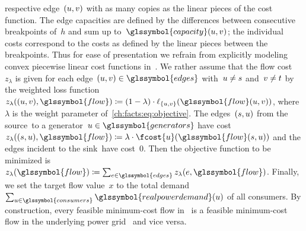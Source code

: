 respective edge~$(u, v)$ with as many copies as the linear pieces
of the cost function. The edge capacities are defined by the differences between
consecutive breakpoints of~$h$ and sum up to~$\glssymbol{capacity}(\vertexa,
\vertexb)$; the individual costs correspond to the costs as defined by the
linear pieces between the breakpoints. Thus for ease of presentation we refrain
from explicitly modeling convex piecewise linear cost functions
in~. We rather assume that the flow cost~$z_\lambda$ is given
for each edge~$ (\vertexa,\vertexb)\in\glssymbol{edges}$ with~$u \ne
s$ and~$v \ne
t$ by the weighted loss function~$
z_\lambda((\vertexa,\vertexb),\glssymbol{flow})
\coloneqq 
(1-\lambda) 
\cdot 
\ell_{\{\vertexa,\vertexb\}}
(\glssymbol{flow}(\vertexa,\vertexb)) 
% 
$, where $\lambda$ is the weight parameter of~\cref{ch:facts:eq:objective}. The
edges~$(s,u)$ from the source~\source to a
generator~$\vertexa\in\glssymbol{generators}$ have
cost~$z_\lambda((\source,\vertexa),\glssymbol{flow}) \coloneqq \lambda \cdot
\fcost{\vertexa}( \glssymbol{flow} ( \source, \vertexa ) )$ and the edges
incident to the sink~\sink have cost~$0$. Then the objective function to be
minimized is~$z_\lambda ( \glssymbol{flow} ) \coloneqq \sum_{\edge \in
\glssymbol{edges}} z_\lambda (
\edge,\glssymbol{flow} )$. Finally, we set the target flow value~$x$ to the total
demand~$\sum_{\vertexa\in \glssymbol{consumers}}
\glssymbol{realpowerdemand}(\vertexa)$ of all consumers. By construction, every
feasible minimum-cost flow in~ is a feasible minimum-cost
flow in the underlying power grid~ and vice versa.
% 
